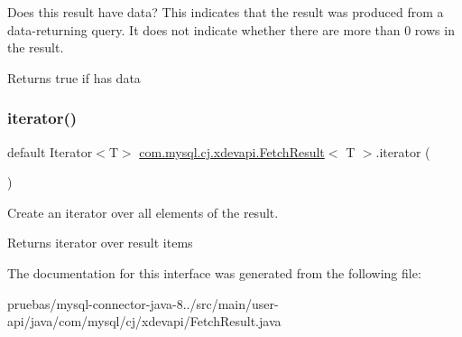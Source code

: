 Does this result have data? This indicates that the result was produced from a data-\/returning query. It does not indicate whether there are more than 0 rows in the result.

\begin{DoxyReturn}{Returns}
true if has data 
\end{DoxyReturn}
\mbox{\label{interfacecom_1_1mysql_1_1cj_1_1xdevapi_1_1_fetch_result_a98165eec59f65bc0dfb8e96b9ddce40c}} 
\subsubsection{\texorpdfstring{iterator()}{iterator()}}
{\footnotesize\ttfamily default Iterator$<$T$>$ \mbox{\hyperlink{interfacecom_1_1mysql_1_1cj_1_1xdevapi_1_1_fetch_result}{com.\+mysql.\+cj.\+xdevapi.\+Fetch\+Result}}$<$ T $>$.iterator (\begin{DoxyParamCaption}{ }\end{DoxyParamCaption})}

Create an iterator over all elements of the result.

\begin{DoxyReturn}{Returns}
iterator over result items 
\end{DoxyReturn}


The documentation for this interface was generated from the following file\+:\begin{DoxyCompactItemize}
\item 
pruebas/mysql-\/connector-\/java-\/8../src/main/user-\/api/java/com/mysql/cj/xdevapi/Fetch\+Result.\+java\end{DoxyCompactItemize}
